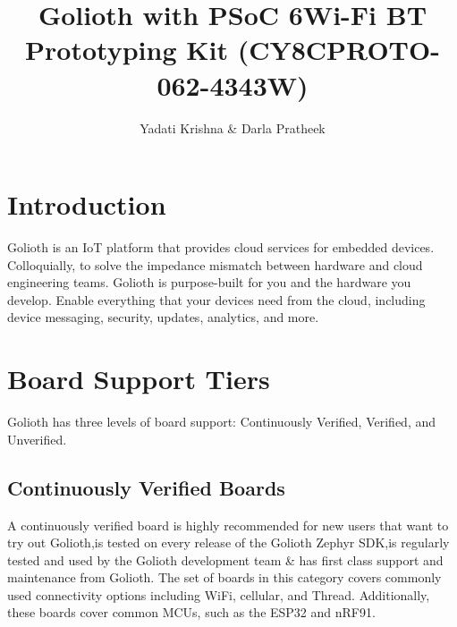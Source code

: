 \documentclass[journal,5pt,twocolumn]{IEEEtran}
\renewcommand\thesection{\arabic{section}}
\begin{document}
\let\StandardTheFigure\thefigure
\let\StandardTheFigure\thefigure
\let\StandardTheTable\thetable
\let\vec\mathbf
\def\putbox#1#2#3{\makebox[0in][l]{\makebox[#1][l]{}\raisebox{\baselineskip}[0in][0in]{\raisebox{#2}[0in][0in]{#3}}}}
     \def\rightbox#1{\makebox[0in][r]{#1}}
     \def\centbox#1{\makebox[0in]{#1}}
     \def\topbox#1{\raisebox{-\baselineskip}[0in][0in]{#1}}
     \def\midbox#1{\raisebox{-0.5\baselineskip}[0in][0in]{#1}}
\title{ 
Golioth with PSoC 6Wi-Fi BT Prototyping Kit (CY8CPROTO-062-4343W)
}
\author{Yadati Krishna \& Darla Pratheek}%
\maketitle
\tableofcontents
\section{\textbf{Introduction}}
Golioth is an IoT platform that provides cloud services for embedded devices. Colloquially, to solve the impedance mismatch between hardware and cloud engineering teams. Golioth is purpose-built for you and the hardware you develop. Enable everything that your devices need from the cloud, including device messaging, security, updates, analytics, and more.
\section{\textbf{Board Support Tiers}}
Golioth has three levels of board support: Continuously Verified, Verified, and Unverified.
\subsection{\textbf{Continuously Verified Boards}}
\raggedright A continuously verified board is highly recommended for new users that want to try out Golioth,is tested on every release of the Golioth Zephyr SDK,is regularly tested and used by the Golioth development team \& has first class support and maintenance from Golioth.
The set of boards in this category covers commonly used connectivity options including WiFi, cellular, and Thread. Additionally, these boards cover common MCUs, such as the ESP32 and nRF91.
\end{document}
